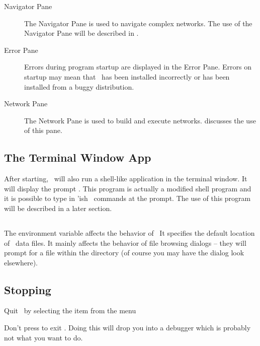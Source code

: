 \begin{description}
\item[Navigator Pane] The Navigator Pane is used to navigate complex
  networks.  The use of the Navigator Pane will be described in
  .
  
\item[Error Pane] Errors during program startup are displayed in the Error
  Pane.  Errors on startup may mean that \sr\ has been installed
  incorrectly or has been installed from a buggy distribution.
  
\item[Network Pane] The Network Pane is used to build and execute networks.
   discusses the use of this
  pane.

\end{description}

\subsection{The Terminal Window App}
\label{sec:termwinapp}

After starting, \sr\ will also run a shell-like application in the terminal
window.  It will display the prompt .  This program is
actually a modified  shell program and it
is possible to type in 'ish \sr\ commands at the prompt. The
use of this program will be described in a later section.


\subsection{}
\label{sec:scirundata}

The environment variable  affects the behavior of \sr\ 
It specifies the default location of \sr\ data files.  It mainly affects
the behavior of file browsing dialogs -- they will prompt for a file within
the \envvar{SCIRUN\_DATA} directory (of course you may have the dialog look
elsewhere).


\subsection{Stopping}
\label{sec:stopping}

Quit \sr\ by selecting the  item from the  menu

Don't press  to exit \sr.  Doing this will drop you into
a debugger which is probably not what you want to do.


